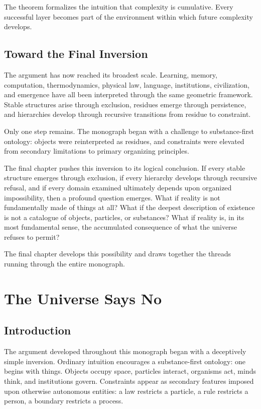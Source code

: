 \documentclass[11pt,oneside]{book}
\theoremstyle{plain}
\theoremstyle{definition}
\theoremstyle{remark}
\begin{document}
The theorem formalizes the intuition that complexity is cumulative. Every successful layer becomes part of the environment within which future complexity develops.

\section{Toward the Final Inversion}

The argument has now reached its broadest scale. Learning, memory, computation, thermodynamics, physical law, language, institutions, civilization, and emergence have all been interpreted through the same geometric framework. Stable structures arise through exclusion, residues emerge through persistence, and hierarchies develop through recursive transitions from residue to constraint.

Only one step remains. The monograph began with a challenge to substance-first ontology: objects were reinterpreted as residues, and constraints were elevated from secondary limitations to primary organizing principles.

The final chapter pushes this inversion to its logical conclusion. If every stable structure emerges through exclusion, if every hierarchy develops through recursive refusal, and if every domain examined ultimately depends upon organized impossibility, then a profound question emerges. What if reality is not fundamentally made of things at all? What if the deepest description of existence is not a catalogue of objects, particles, or substances? What if reality is, in its most fundamental sense, the accumulated consequence of what the universe refuses to permit?

The final chapter develops this possibility and draws together the threads running through the entire monograph.

\chapter{The Universe Says No}

\section{Introduction}

The argument developed throughout this monograph began with a deceptively simple inversion. Ordinary intuition encourages a substance-first ontology: one begins with things. Objects occupy space, particles interact, organisms act, minds think, and institutions govern. Constraints appear as secondary features imposed upon otherwise autonomous entities: a law restricts a particle, a rule restricts a person, a boundary restricts a process.
\end{document}
